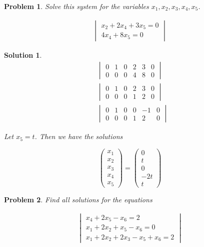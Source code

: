 \documentclass{article}
\newtheorem{problem}{Problem}
\newtheorem*{solution}{Solution}
\begin{document}
\begin{problem}

Solve this system for the variables $x_{1}, x_{2}, x_{3}, x_{4}, x_{5}$.

\begin{align*}
\begin{vmatrix}
x_{2} + 2x_{4} + 3x_{5} = 0 \\
4x_{4} + 8x_{5} = 0
\end{vmatrix}
\end{align*}

\end{problem}

\begin{solution}
\begin{align*}
&\begin{vmatrix}
0 & 1 & 0 & 2 & 3 & 0 \\
0 & 0 & 0 & 4 & 8 & 0 
\end{vmatrix} \\
&\begin{vmatrix}
0 & 1 & 0 & 2 & 3 & 0 \\
0 & 0 & 0 & 1 & 2 & 0 
\end{vmatrix} \\
&\begin{vmatrix}
0 & 1 & 0 & 0 & -1 & 0 \\
0 & 0 & 0 & 1 & 2 & 0 
\end{vmatrix}
\end{align*}

Let $x_{5} = t$. Then we have the solutions

\begin{equation*}
\begin{pmatrix}
x_{1} \\ x_{2} \\ x_{3} \\ x_{4} \\ x_{5}
\end{pmatrix}
=
\begin{pmatrix}
0 \\ t \\ 0 \\ -2t \\ t
\end{pmatrix}
\end{equation*}


\end{solution}

\begin{problem}

Find all solutions for the equations

\begin{align*}
\begin{vmatrix}
x_{4} + 2x_{5} - x_{6} = 2 \\
x_{1} + 2x_{2} + x_{5} - x_{6} = 0 \\
x_{1} + 2x_{2} + 2x_{3} - x_{5} + x_{6} = 2
\end{vmatrix}
\end{align*}

\end{problem}
\end{document}
